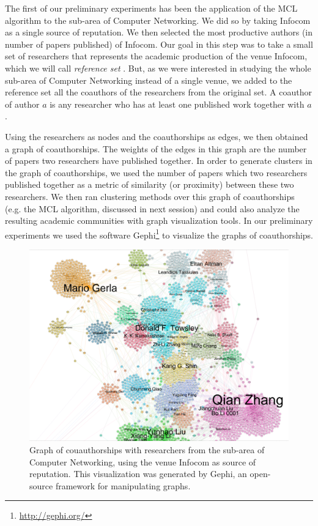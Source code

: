 \documentclass[msc]{ppgccufmg}
\begin{document}
\begin{appendices}
The first of our preliminary experiments has been the application of the MCL algorithm to the sub-area of Computer Networking. We did so by taking Infocom as a single source of reputation. We then selected the most productive authors (in number of papers published) of Infocom. Our goal in this step was to take a small set of researchers that represents the academic production of the venue Infocom, which we will call \textit{reference set} . But, as we were interested in studying the whole sub-area of Computer Networking instead of a single venue, we added to the reference set all the coauthors of the researchers from the original set. A coauthor of author $a$ is any researcher who has at least one published work together with $a$. 

Using the researchers as nodes and the coauthorships as edges, we then obtained a graph of coauthorships. The weights of the edges in this graph are the number of papers two researchers have published together. In order to generate clusters in the graph of coauthorships, we used the number of papers which two researchers published together as a metric of similarity (or proximity) between these two researchers. We then ran clustering methods over this graph of coauthorships (e.g. the MCL algorithm, discussed in next session) and could also analyze the resulting academic communities with graph visualization tools. In our preliminary experiments we used the software Gephi\footnote{\url{http://gephi.org/}} to visualize the graphs of coauthorships.

\begin{figure}[h]
    \centering
    \includegraphics[scale=0.3]{fig/infocom}
    \caption{Graph of couauthorships with researchers from the sub-area of Computer Networking, using the venue Infocom as source of reputation. This visualization was generated by Gephi, an open-source framework for manipulating graphs.}
    \label{fig:exemplo}
\end{figure}


\end{appendices}
\end{document}
